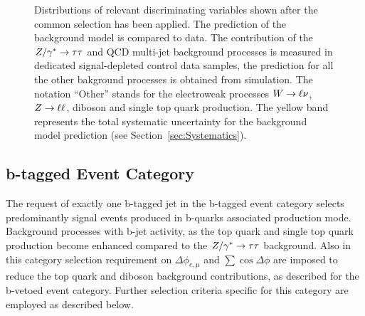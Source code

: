 \begin{figure}[p]
\begin{center}
{	    \label{Ht}	
     }	

    \end{center}
    \caption{Distributions of relevant discriminating variables shown after the common selection has been applied.
	The prediction of the  background model is compared to  data.
	The contribution of the $Z/\gamma^*\rightarrow \tau\tau$ and QCD multi-jet background processes is measured in  dedicated  signal-depleted control data samples,
	the prediction for all the other bakground processes is obtained from simulation.
 	 The notation ``Other'' stands 	for the electroweak processes $W\rightarrow \ell \nu$, $Z\rightarrow \ell \ell$, diboson and single top quark production.
	The yellow band represents the total systematic uncertainty for the background model prediction (see Section~\ref{sec:Systematics}).}
   \label{fig:selections}
\end{figure}

\subsection{b-tagged Event Category}\label{sec:tag}
The request of exactly one b-tagged jet in the b-tagged event category selects predominantly signal events produced 
in  b-quarks associated production mode.
Background processes with b-jet activity, as the top quark and single top quark production become enhanced compared to the $Z/\gamma^*\rightarrow \tau\tau$ background.
Also in this category selection requirement on $\Delta\phi_{e,\mu}$ and $\sum\cos\Delta\phi$  are imposed to reduce the top quark and diboson background contributions,
as described for the b-vetoed event category. Further selection criteria specific for  this category
are employed  as described below.

